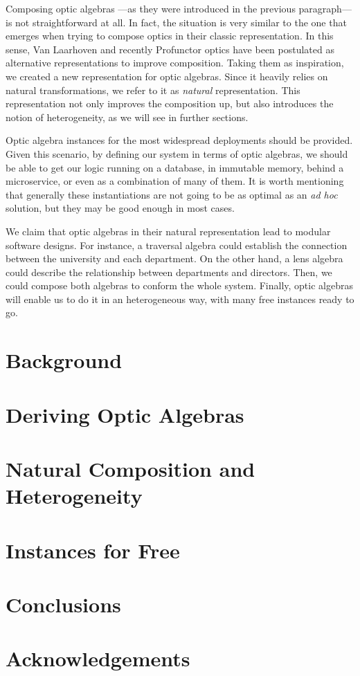 \documentclass[a4paper]{article}
\begin{document}

Composing optic algebras ---as they were introduced in the previous paragraph---
is not straightforward at all. In fact, the situation is very similar to the one
that emerges when trying to compose optics in their classic representation. In
this sense, Van Laarhoven and recently Profunctor optics have been postulated as
alternative representations to improve composition. Taking them as inspiration,
we created a new representation for optic algebras. Since it heavily relies on
natural transformations, we refer to it as \emph{natural} representation. This
representation not only improves the composition up, but also introduces the
notion of heterogeneity, as we will see in further sections.


Optic algebra instances for the most widespread deployments should be provided.
Given this scenario, by defining our system in terms of optic algebras, we
should be able to get our logic running on a database, in immutable memory,
behind a microservice, or even as a combination of many of them. It is worth
mentioning that generally these instantiations are not going to be as optimal as
an \emph{ad hoc} solution, but they may be good enough in most cases.


We claim that optic algebras in their natural representation lead to modular
software designs. For instance, a traversal algebra could establish the
connection between the university and each department. On the other hand, a lens
algebra could describe the relationship between departments and directors. Then,
we could compose both algebras to conform the whole system. Finally, optic
algebras will enable us to do it in an heterogeneous way, with many free
instances ready to go.

\section{Background}

\section{Deriving Optic Algebras}

\section{Natural Composition and Heterogeneity}

\section{Instances for Free}

\section{Conclusions}

\section{Acknowledgements}
\end{document}
